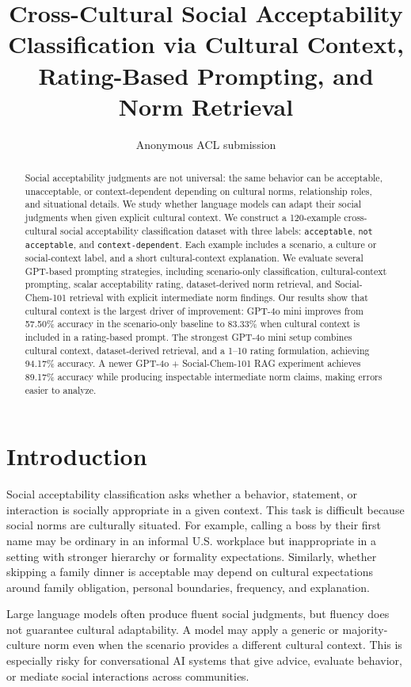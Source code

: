 \documentclass[11pt]{article}
\title{Cross-Cultural Social Acceptability Classification via Cultural Context, Rating-Based Prompting, and Norm Retrieval}
\author{Anonymous ACL submission}
\date{}
\begin{document}
\maketitle

\begin{abstract}
Social acceptability judgments are not universal: the same behavior can be acceptable, unacceptable, or context-dependent depending on cultural norms, relationship roles, and situational details. We study whether language models can adapt their social judgments when given explicit cultural context. We construct a 120-example cross-cultural social acceptability classification dataset with three labels: \texttt{acceptable}, \texttt{not acceptable}, and \texttt{context-dependent}. Each example includes a scenario, a culture or social-context label, and a short cultural-context explanation. We evaluate several GPT-based prompting strategies, including scenario-only classification, cultural-context prompting, scalar acceptability rating, dataset-derived norm retrieval, and Social-Chem-101 retrieval with explicit intermediate norm findings. Our results show that cultural context is the largest driver of improvement: GPT-4o mini improves from 57.50\% accuracy in the scenario-only baseline to 83.33\% when cultural context is included in a rating-based prompt. The strongest GPT-4o mini setup combines cultural context, dataset-derived retrieval, and a 1--10 rating formulation, achieving 94.17\% accuracy. A newer GPT-4o + Social-Chem-101 RAG experiment achieves 89.17\% accuracy while producing inspectable intermediate norm claims, making errors easier to analyze.
\end{abstract}

\section{Introduction}

Social acceptability classification asks whether a behavior, statement, or interaction is socially appropriate in a given context. This task is difficult because social norms are culturally situated. For example, calling a boss by their first name may be ordinary in an informal U.S. workplace but inappropriate in a setting with stronger hierarchy or formality expectations. Similarly, whether skipping a family dinner is acceptable may depend on cultural expectations around family obligation, personal boundaries, frequency, and explanation.

Large language models often produce fluent social judgments, but fluency does not guarantee cultural adaptability. A model may apply a generic or majority-culture norm even when the scenario provides a different cultural context. This is especially risky for conversational AI systems that give advice, evaluate behavior, or mediate social interactions across communities.
\end{document}
